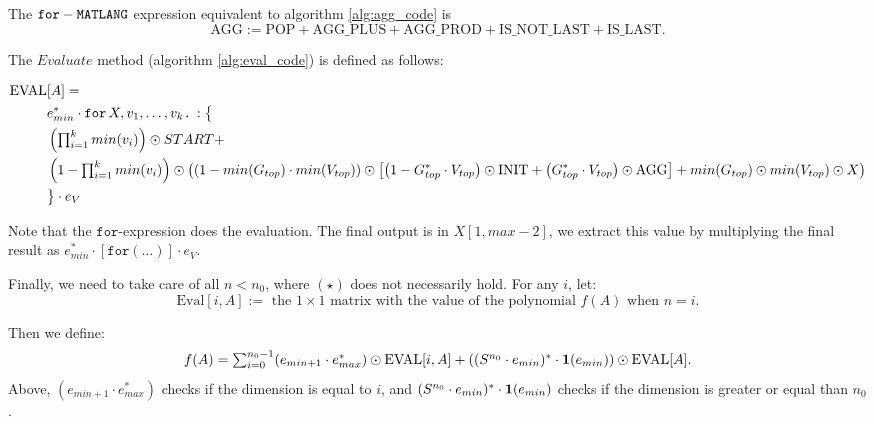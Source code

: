 The $\texttt{for}-\texttt{MATLANG}$ expression equivalent to algorithm \ref{alg:agg_code} is $$\text{AGG}:=\text{POP} + \text{AGG{\_}PLUS}+\text{AGG{\_}PROD}+\text{IS{\_}NOT{\_}LAST}+\text{IS{\_}LAST}.$$

The $Evaluate$ method (algorithm \ref{alg:eval_code}) is defined as follows:

\begin{align*}
	\text{EVAL}&[A]= \\
	&e_{min}^* \cdot \texttt{for}\, X,v_1, \ldots, v_k \texttt{.}\, : \big\lbrace \\
	&\left( \textstyle\prod_{i=1}^k min(v_i)\right) \odot START + \\
	&\left( 1- \textstyle\prod_{i=1}^k min(v_i)\right) \odot \left( \left(1 - min(G_{top})\cdot min(V_{top}) \right) \odot \left[ \left( 1 - G_{top}^*\cdot V_{top} \right) \odot \text{INIT} + \left(  G_{top}^*\cdot V_{top} \right) \odot \text{AGG} \right] + min(G_{top})\odot min(V_{top})\odot X\right) \\ 
	&\big\rbrace \cdot e_{V}
\end{align*}

Note that the $ \texttt{for}$-expression does the evaluation. The final output is in $X[1,max-2]$, we extract this value by multiplying the final result as $e_{min}^*\cdot [\texttt{for}(\ldots )]\cdot e_{V}$.

Finally, we need to take care of all $n<n_0$, where $(\star)$ does not necessarily hold. For any $i$, let: $$\text{Eval}[i,A]:= \text{ the } 1\times 1 \text{ matrix with the value of the polynomial } f(A) \text{ when } n=i.$$

Then we define: $$f(A)=\textstyle\sum_{i=0}^{n_0-1}(e_{min+1}\cdot e_{max}^*)\odot \text{EVAL}[i,A] + \left( (S^{n_0}\cdot e_{min})^*\cdot \mathbf{1} (e_{min}) \right)\odot \text{EVAL}[A].$$ Above, $(e_{min+1}\cdot e_{max}^*)$ checks if the dimension is equal to $i$, and $(S^{n_0}\cdot e_{min})^*\cdot \mathbf{1} (e_{min})$ checks if the dimension is greater or equal than $n_0$.












